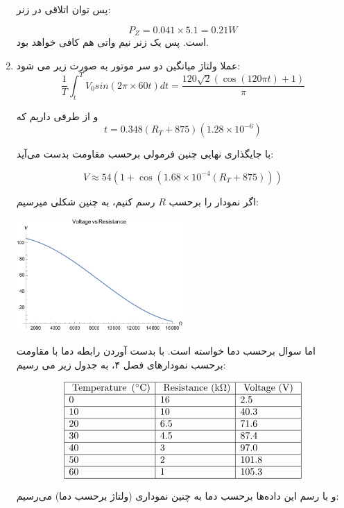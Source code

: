 \documentclass[12pt]{article}
\begin{document}
\begin{enumerate}
پس توان اتلاقی در زنر:

$$P_Z =0.041\times 5.1 = 0.21 W$$
است. پس یک زنر نیم واتی هم کافی خواهد بود.

\item

عملا ولتاژ میانگین دو سر موتور به صورت زیر می شود:
$$\frac{1}{T}\int_{t}^{T} V_0 sin(2 \pi \times 60 t) dt = \frac{120 \sqrt{2} (\cos (120 \pi  t)+1)}{\pi }$$

و از طرفی داریم که 
$$t = 0.348 (R_T + 875)(1.28 \times 10^{-6})$$ 

با جایگذاری نهایی چنین فرمولی برحسب مقاومت بدست می‌آید:

$$V \approx 54(1+\cos(1.68 \times 10^{-4}(R_T + 875)))$$

اگر نمودار را برحسب $R$ رسم کنیم، به چنین شکلی میرسیم:

\begin{center}
\includegraphics[width =0.5\textwidth]{images/1.pdf}	
\end{center}

اما سوال برحسب دما خواسته است. با بدست آوردن رابطه دما با مقاومت برحسب نمودارهای فصل ۴، به جدول زیر می رسیم:

$$
\begin{array}{|l|l|l|}
	\hline \text { Temperature }\left({ }^{\circ} \mathrm{C}\right) & \text { Resistance }(\mathrm{k} \Omega) & \text { Voltage (V) } \\
	\hline 0 & 16 & 2.5 \\
	\hline 10 & 10 & 40.3 \\
	\hline 20 & 6.5 & 71.6 \\
	\hline 30 & 4.5 & 87.4 \\
	\hline 40 & 3 & 97.0 \\
	\hline 50 & 2 & 101.8 \\
	\hline 60 & 1 & 105.3 \\
	\hline
\end{array}
$$

و با رسم این داده‌ها برحسب دما به چنین نموداری (ولتاژ برحسب دما) می‌رسیم:


\end{enumerate}
\end{document}
